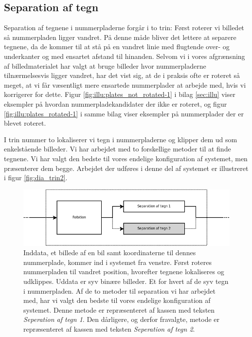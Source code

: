 \subsection{Separation af tegn}
Separation af tegnene i nummerpladerne forgår i to trin: Først roterer vi billedet så nummerpladen ligger vandret. På denne måde bliver det lettere at separere tegnene, da de kommer til at stå på en vandret linie med flugtende over- og underkanter og med ensartet afstand til hinanden. Selvom vi i vores afgrænsning af billedmaterialet har valgt at bruge billeder hvor nummerpladerne tilnærmelsesvis ligger vandret, har det vist sig, at de i praksis ofte er roteret så meget, at vi får væsentligt mere ensartede nummerplader at arbejde med, hvis vi korrigerer for dette. Figur \vref{fig:illu:plates_not_rotated-1} i bilag \ref{sec:illu} viser eksempler på hvordan nummerpladekandidater der ikke er roteret, og figur \ref{fig:illu:plates_rotated-1} i samme bilag viser eksempler på nummerplader der er blevet roteret.

I trin nummer to lokaliserer vi tegn i nummerpladerne og klipper dem ud som enkelstående billeder. Vi har arbejdet med to forskellige metoder til at finde tegnene. Vi har valgt den bedste til vores endelige konfiguration af systemet, men præsenterer dem begge. Arbejdet der udføres i denne del af systemet er illustreret i figur \vref{fig:dia_trin2}.


\begin{figure}[htp]
\centering
\includegraphics[width=12cm]{system/illu/dia_trin2.png} 
\caption{Inddata, et billede af en bil samt koordinaterne til dennes nummerplade, kommer ind i systemet fra venstre. Først roteres nummerpladen til vandret position, hvorefter tegnene lokaliseres og udklippes. Uddata er syv binære billeder. Et for hvert af de syv tegn i nummerpladen. Af de to metoder til separation vi har arbejdet med, har vi valgt den bedste til vores endelige konfiguration af systemet. Denne metode er repræsenteret af kassen med teksten \textit{Seperation af tegn 1}. Den dårligere, og derfor fravalgte, metode er repræsenteret af kassen med teksten \textit{Seperation af tegn 2}.}
\label{fig:dia_trin2}
\end{figure}


